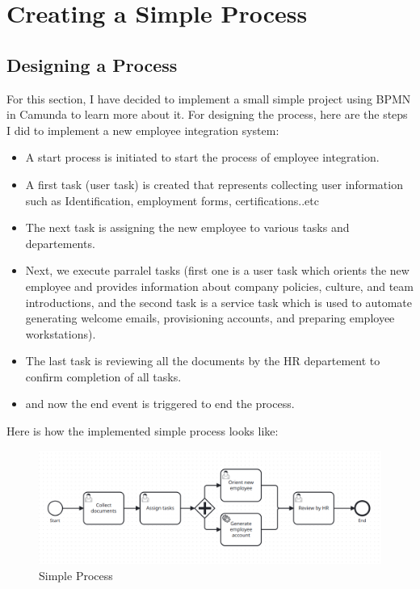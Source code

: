 \documentclass[12pt]{article}
\begin{document}
{  \pagebreak

  \section{Creating a Simple Process}

  \subsection{Designing a Process}

  For this section, I have decided to implement a small simple project using BPMN in Camunda to learn more about it.
  For designing the process, here are the steps I did to implement a new employee integration system:

  \begin{itemize}
    \item A start process is initiated to start the process of employee integration.
    \item A first task (user task) is created that represents collecting user information such as Identification, employment forms, certifications..etc
    \item The next task is assigning the new employee to various tasks and departements.
    \item Next, we execute parralel tasks (first one is a user task which orients the new employee and provides information about company policies, culture, and team introductions, and the second task is a service task which is used to automate generating welcome emails, provisioning accounts, and preparing employee workstations).
    \item The last task is reviewing all the documents by the HR departement to confirm completion of all tasks.
    \item and now the end event is triggered to end the process.
  \end{itemize}

  \pagebreak

  Here is how the implemented simple process looks like:

  \begin{figure}[h]
    \centering
    \includegraphics[width=.90\linewidth]{simple_process.png}
    \caption{Simple Process}
    \label{fig:simple_process}
  \end{figure}

}
\end{document}

